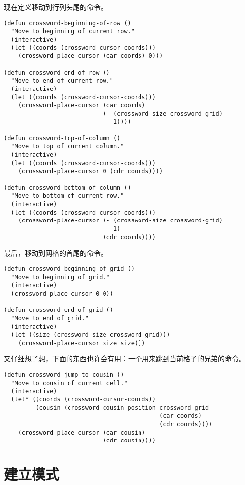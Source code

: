 现在定义移动到行列头尾的命令。

\begin{verbatim}
(defun crossword-beginning-of-row ()
  "Move to beginning of current row."
  (interactive)
  (let ((coords (crossword-cursor-coords)))
    (crossword-place-cursor (car coords) 0)))

(defun crossword-end-of-row ()
  "Move to end of current row."
  (interactive)
  (let ((coords (crossword-cursor-coords)))
    (crossword-place-cursor (car coords)
                            (- (crossword-size crossword-grid)
                               1))))

(defun crossword-top-of-column ()
  "Move to top of current column."
  (interactive)
  (let ((coords (crossword-cursor-coords)))
    (crossword-place-cursor 0 (cdr coords))))

(defun crossword-bottom-of-column ()
  "Move to bottom of current row."
  (interactive)
  (let ((coords (crossword-cursor-coords)))
    (crossword-place-cursor (- (crossword-size crossword-grid)
                               1)
                            (cdr coords))))
\end{verbatim}

最后，移动到网格的首尾的命令。

\begin{verbatim}
(defun crossword-beginning-of-grid ()
  "Move to beginning of grid."
  (interactive)
  (crossword-place-cursor 0 0))

(defun crossword-end-of-grid ()
  "Move to end of grid."
  (interactive)
  (let ((size (crossword-size crossword-grid)))
    (crossword-place-cursor size size)))
\end{verbatim}

又仔细想了想，下面的东西也许会有用：一个用来跳到当前格子的兄弟的命令。

\begin{verbatim}
(defun crossword-jump-to-cousin ()
  "Move to cousin of current cell."
  (interactive)
  (let* ((coords (crossword-cursor-coords))
         (cousin (crossword-cousin-position crossword-grid
                                            (car coords)
                                            (cdr coords))))
    (crossword-place-cursor (car cousin)
                            (cdr cousin))))
\end{verbatim}

\section{建立模式}
\label{section:10-Setting-Up-the-Mode}

